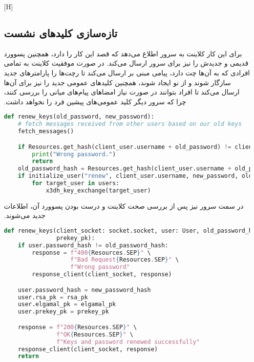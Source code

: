 ‫[H]
‫
‫
‫
‫
‫
‫\subsection{تازه‌سازی کلیدهای نشست}
‫برای این کار کلاینت به سرور اطلاع می‌دهد که قصد این کار را دارد، همچنین پسوورد قدیمی و جدیدش را نیز برای سرور ارسال می‌کند. در صورت موفقیت کلاینت به تمامی افرادی که به آن‌ها چت دارد، پیامی مبنی بر  ارسال می‌کند تا رچت‌ها را پارامترهای جدید سازگار شوند و از نو ایجاد شوند، همچنین کلیدهای عمومی جدید را نیز برای آن‌ها ارسال می‌کند تا افراد بتوانند در صورت نیاز امضاهای پیام‌های میانی را بررسی کنند، چرا که سرور دیگر کلید عمومی‌های پیشین فرد را نخواهد داشت.
‫
\begin{latin}
\begin{lstlisting}[firstnumber=720, language=Python]
def renew_keys(old_password, new_password):
    # fetch messages received from other users based on our old keys
    fetch_messages()

    if Resources.get_hash(client_user.username + old_password) != client_user.password_hash:
        print("Wrong password.")
        return
    old_password_hash = Resources.get_hash(client_user.username + old_password)
    if initialize_user("renew", client_user.username, new_password, old_password_hash):
        for target_user in users:
            x3dh_key_exchange(target_user)
\end{lstlisting}
\end{latin}

‫در سمت سرور نیز پس از بررسی صحت کلاینت و درست بودن پسوورد آن، اطلاعات جدید می‌شوند.
‫
\begin{latin}
\begin{lstlisting}[firstnumber=92, language=Python]
def renew_keys(client_socket: socket.socket, user: User, old_password_hash, new_password_hash, rsa_pk, elgamal_pk,
               prekey_pk):
    if user.password_hash != old_password_hash:
        response = f"400{Resources.SEP}" \
                   f"Bad Request{Resources.SEP}" \
                   f"Wrong password"
        response_client(client_socket, response)

    user.password_hash = new_password_hash
    user.rsa_pk = rsa_pk
    user.elgamal_pk = elgamal_pk
    user.prekey_pk = prekey_pk

    response = f"200{Resources.SEP}" \
               f"OK{Resources.SEP}" \
               f"Keys and password renewed successfully"
    response_client(client_socket, response)
    return
\end{lstlisting}
\end{latin}

